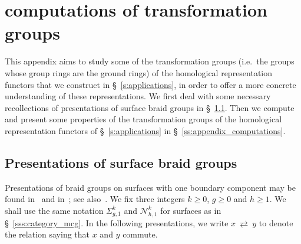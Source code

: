 \documentclass[AHL,Unicode,published]{cedram}
\newcommand{\N}{\mathscr{N}}
\renewcommand{\geq}{\geqslant}
\begin{document}
\appendix
\section{computations of transformation groups}\label{s:Appendix}

This appendix aims to study some of the transformation groups (i.e.~the groups whose group rings are the ground rings) of the homological representation functors that we construct in \S~\ref{s:applications}, in order to offer a more concrete understanding of these representations. We first deal with some necessary recollections of presentations of surface braid groups in \S~\ref{ss:presentation_surface_braids}. Then we compute and present some properties of the transformation groups of the homological representation functors of \S~\ref{s:applications} in \S~\ref{ss:appendix_computations}.


\subsection{Presentations of surface braid groups}\label{ss:presentation_surface_braids}

Presentations of braid groups on surfaces with one boundary component may be found in~\cite[\S~4]{LambropoulouOldenburg} and in~\cite[Th.~1.1 and App.~2]{Bellingeripresentations}; see also~\cite[\S~6.3]{DPS}. We fix three integers $k\geq 0$, $g\geq 0$ and $h\geq 1$. We shall use the same notation $\Sigma_{g,1}^{k}$ and $\N_{h,1}^{k}$ for surfaces as in \S~\ref{sss:category_mcg}. In the following presentations, we write $x\ \rightleftarrows\ y$ to denote the relation saying that $x$ and $y$ commute.
\end{document}

